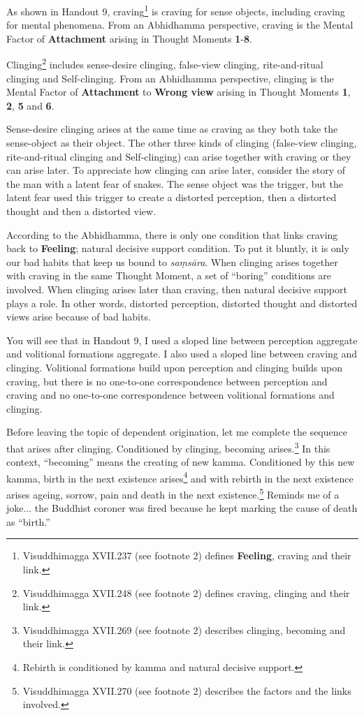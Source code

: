 As shown in Handout 9, craving\footnote{Visuddhimagga XVII.237 (see footnote 2) defines \textbf{Feeling}, craving and their link.} is craving for sense objects, including craving for mental phenomena. From an Abhidhamma perspective, craving is the Mental Factor of \textbf{Attachment} arising in Thought Moments \textbf{1}-\textbf{8}.

Clinging\footnote{Visuddhimagga XVII.248 (see footnote 2) defines craving, clinging and their link.} includes sense-desire clinging, false-view clinging, rite-and-ritual clinging and Self-clinging. From an Abhidhamma perspective, clinging is the Mental Factor of \textbf{Attachment} to \textbf{Wrong view} arising in Thought Moments \textbf{1}, \textbf{2}, \textbf{5} and \textbf{6}.

Sense-desire clinging arises at the same time as craving as they both take the sense-object as their object. The other three kinds of clinging (false-view clinging, rite-and-ritual clinging and Self-clinging) can arise together with craving or they can arise later. To appreciate how clinging can arise later, consider the story of the man with a latent fear of snakes. The sense object was the trigger, but the latent fear used this trigger to create a distorted perception, then a distorted thought and then a distorted view.

According to the Abhidhamma, there is only one condition that links craving back to \textbf{Feeling}; natural decisive support condition. To put it bluntly, it is only our bad habits that keep us bound to \textit{saṃsāra}. When clinging arises together with craving in the same Thought Moment, a set of “boring” conditions are involved. When clinging arises later than craving, then natural decisive support plays a role. In other words, distorted perception, distorted thought and distorted views arise because of bad habits.

You will see that in Handout 9, I used a sloped line between perception aggregate and volitional formations aggregate. I also used a sloped line between craving and clinging. Volitional formations build upon perception and clinging builds upon craving, but there is no one-to-one correspondence between perception and craving and no one-to-one correspondence between volitional formations and clinging.

Before leaving the topic of dependent origination, let me complete the sequence that arises after clinging. Conditioned by clinging, becoming arises.\footnote{Visuddhimagga XVII.269 (see footnote 2) describes clinging, becoming and their link.} In this context, “becoming” means the creating of new kamma. Conditioned by this new kamma, birth in the next existence arises\footnote{Rebirth is conditioned by kamma and natural decisive support.} and with rebirth in the next existence arises ageing, sorrow, pain and death in the next existence.\footnote{Visuddhimagga XVII.270 (see footnote 2) describes the factors and the links involved.} Reminds me of a joke... the Buddhist coroner was fired because he kept marking the cause of death as “birth.” 


